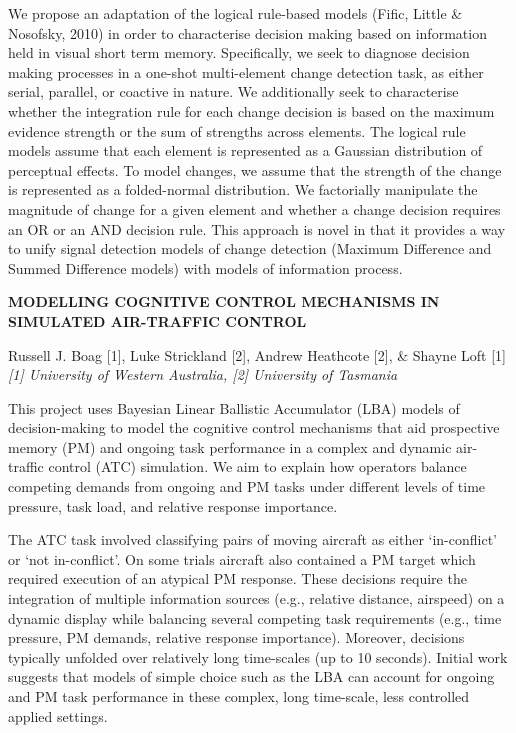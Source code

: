 \documentclass[]{article}
\begin{document}
We propose an adaptation of the logical rule-based models (Fific, Little
\& Nosofsky, 2010) in order to characterise decision making based on
information held in visual short term memory. Specifically, we seek to
diagnose decision making processes in a one-shot multi-element change
detection task, as either serial, parallel, or coactive in nature. We
additionally seek to characterise whether the integration rule for each
change decision is based on the maximum evidence strength or the sum of
strengths across elements. The logical rule models assume that each
element is represented as a Gaussian distribution of perceptual effects.
To model changes, we assume that the strength of the change is
represented as a folded-normal distribution. We factorially manipulate
the magnitude of change for a given element and whether a change
decision requires an OR or an AND decision rule. This approach is novel
in that it provides a way to unify signal detection models of change
detection (Maximum Difference and Summed Difference models) with models
of information process.\\
\pagebreak  

\textbf{MODELLING COGNITIVE CONTROL MECHANISMS IN SIMULATED AIR-TRAFFIC
CONTROL}

Russell J. Boag {[}1{]}, Luke Strickland {[}2{]}, Andrew Heathcote
{[}2{]}, \& Shayne Loft {[}1{]}\\
\emph{{[}1{]} University of Western Australia, {[}2{]} University of
Tasmania}

This project uses Bayesian Linear Ballistic Accumulator (LBA) models of
decision-making to model the cognitive control mechanisms that aid
prospective memory (PM) and ongoing task performance in a complex and
dynamic air-traffic control (ATC) simulation. We aim to explain how
operators balance competing demands from ongoing and PM tasks under
different levels of time pressure, task load, and relative response
importance.

The ATC task involved classifying pairs of moving aircraft as either
`in-conflict' or `not in-conflict'. On some trials aircraft also
contained a PM target which required execution of an atypical PM
response. These decisions require the integration of multiple
information sources (e.g., relative distance, airspeed) on a dynamic
display while balancing several competing task requirements (e.g., time
pressure, PM demands, relative response importance). Moreover, decisions
typically unfolded over relatively long time-scales (up to 10 seconds).
Initial work suggests that models of simple choice such as the LBA can
account for ongoing and PM task performance in these complex, long
time-scale, less controlled applied settings.
\end{document}
